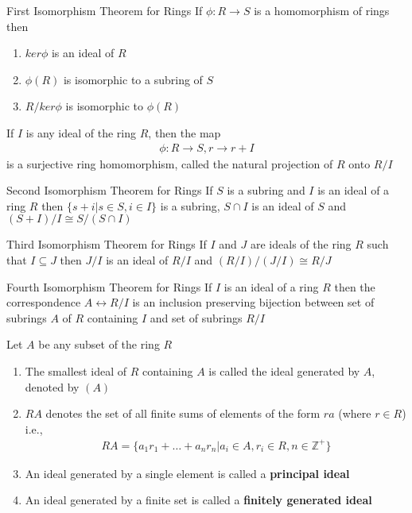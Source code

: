 \documentclass[titlepage, 12pt]{book}
\begin{document}
\begin{theorem}{First Isomorphism Theorem for Rings}{}
    If $\phi:R\rightarrow S$ is a homomorphism of rings then
    \begin{enumerate}
        \item $ker\phi$ is an ideal of $R$
        \item $\phi(R)$ is isomorphic to a subring of $S$
        \item $R/ker\phi$ is isomorphic to $\phi(R)$
    \end{enumerate}
\end{theorem}

\begin{definition}{}{}
    If $I$ is any ideal of the ring $R$, then the map
    \begin{gather*}
        \phi:R\rightarrow S, r\rightarrow r+I
    \end{gather*}
    is a surjective ring homomorphism, called the natural projection of $R$ onto
    $R/I$
\end{definition}

\begin{theorem}{Second Isomorphism Theorem for Rings}{}
    If $S$ is a subring and $I$ is an ideal of a ring $R$ then $\{s + i|s\in S,
    i\in I\}$ is a subring, $S\cap I$ is an ideal of $S$ and $(S+I)/I\cong
    S/(S\cap I)$
\end{theorem}

\begin{theorem}{Third Isomorphism Theorem for Rings}{}
    If $I$ and $J$ are ideals of the ring $R$ such that $I\subseteq J$ then
    $J/I$ is an ideal of $R/I$ and $(R/I)/(J/I)\cong R/J$
\end{theorem}

\begin{theorem}{Fourth Isomorphism Theorem for Rings}{}
    If $I$ is an ideal of a ring $R$ then the correspondence $A\leftrightarrow
    R/I$ is an inclusion preserving bijection between set of subrings $A$ of $R$
    containing $I$ and set of subrings $R/I$
\end{theorem}

\begin{definition}{}{}
    Let $A$ be any subset of the ring $R$
    \begin{enumerate}
        \item The smallest ideal of $R$ containing $A$ is called the ideal
            generated by $A$, denoted by $(A)$
        \item $RA$ denotes the set of all finite sums of elements of the form
            $ra$ (where $r\in R$) i.e.,
            \begin{gather*}
                RA = \{a_1r_1+\dots+a_nr_n | a_i\in A, r_i\in R,
                n\in\mathbb{Z}^+\}
            \end{gather*}
        \item An ideal generated by a single element is called a
            \textbf{principal ideal}
        \item An ideal generated by a finite set is called a \textbf{finitely
            generated ideal}
    \end{enumerate}
\end{definition}
\end{document}
